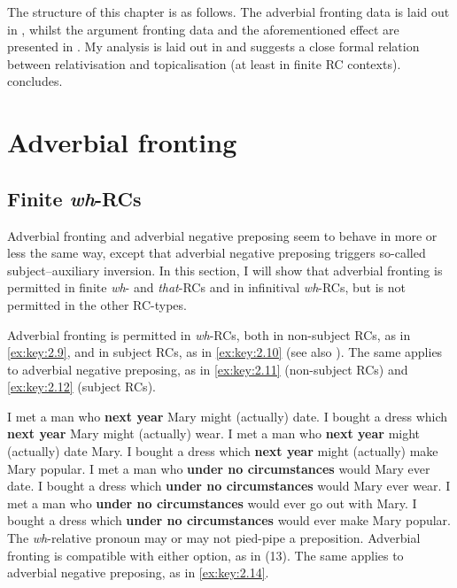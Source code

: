 \documentclass[output=paper]{langsci/langscibook}
\begin{document}
The structure of this chapter is as follows. The adverbial
fronting data is laid out in , whilst
the argument fronting data and the aforementioned 
effect are presented in . My analysis is laid out in
 and suggests a close formal relation between relativisation
and topicalisation (at least in finite \gls{RC}
contexts).  concludes.

\section{Adverbial fronting}\label{sec:key:02.2}

\subsection{Finite \emph{wh}-RCs}\label{sec:key:02.2.1}

Adverbial fronting and adverbial negative preposing seem to behave in more or
less the same way, except that adverbial negative preposing triggers so-called
subject--auxiliary inversion. In this section, I will show that adverbial
fronting is permitted in finite \emph{wh}- and \emph{that}-\glspl{RC} and in
infinitival \emph{wh}{-RCs, but is not permitted in the other RC-types.}

Adverbial fronting is permitted in \emph{wh}{-RCs, b}oth in non-subject RCs, as
in \eqref{ex:key:2.9}, and in subject RCs, as in \eqref{ex:key:2.10} (see also
\citealt{Doherty1993,Doherty2000}). The same
applies to adverbial negative preposing, as in \eqref{ex:key:2.11} (non-subject RCs) and \eqref{ex:key:2.12}
(subject RCs).

\ea\label{ex:key:2.9}
    \ea    I met a man who \textbf{next year} Mary might (actually) date.
    \ex    I bought a dress which \textbf{next year} Mary might (actually) wear.
    \z
\z
\ea\label{ex:key:2.10}
    \ea    I met a man who \textbf{next year} might (actually) date Mary.
    \ex    I bought a dress which \textbf{next year} might (actually) make Mary popular.
    \z
\z
\ea\label{ex:key:2.11}
    \ea    I met a man who \textbf{under no circumstances} would Mary ever date.
    \ex    I bought a dress which \textbf{under no circumstances} would Mary ever wear.
    \z
\z
\ea\label{ex:key:2.12}
    \ea    I met a man who \textbf{under no circumstances} would ever go out with Mary.
    \ex    I bought a dress which \textbf{under no circumstances} would ever make Mary popular.
    \z
\z
The \emph{wh}{-relative pronoun may or may not pied-pipe a preposition.
Adverbial fronting is compatible with either option, as in (}13). The same
applies to adverbial negative preposing, as in \eqref{ex:key:2.14}.
\end{document}
